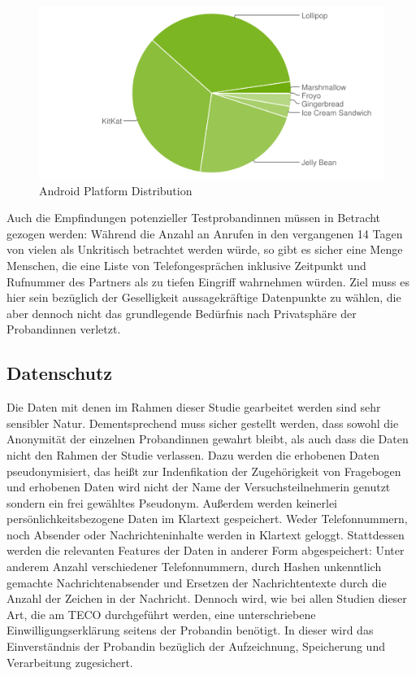 \begin{figure}[h]
    \centering
    \includegraphics{images/chart.png}
    \caption{Android Platform Distribution\cite{androiddistr}}
    \label{fig:androidplatformdistr}
\end{figure}

Auch die Empfindungen potenzieller Testprobandinnen müssen in Betracht gezogen werden:
Während die Anzahl an Anrufen in den vergangenen 14 Tagen von vielen als Unkritisch betrachtet werden würde, so gibt es sicher eine Menge Menschen, 
die eine Liste von Telefongesprächen inklusive Zeitpunkt und Rufnummer des Partners als zu tiefen Eingriff wahrnehmen würden.
Ziel muss es hier sein bezüglich der Geselligkeit aussagekräftige Datenpunkte zu wählen, 
die aber dennoch nicht das grundlegende Bedürfnis nach Privatsphäre der Probandinnen verletzt.


\subsection{Datenschutz}

Die Daten mit denen im Rahmen dieser Studie gearbeitet werden sind sehr sensibler Natur.
Dementsprechend muss sicher gestellt werden, dass sowohl die Anonymität der einzelnen Probandinnen gewahrt bleibt,
als auch dass die Daten nicht den Rahmen der Studie verlassen.
Dazu werden die erhobenen Daten pseudonymisiert, das heißt zur Indenfikation der Zugehörigkeit von Fragebogen und erhobenen Daten wird nicht der Name der Versuchsteilnehmerin genutzt sondern ein frei gewähltes Pseudonym.
Außerdem werden keinerlei persönlichkeitsbezogene Daten im Klartext gespeichert.
Weder Telefonnummern, noch Absender oder Nachrichteninhalte werden in Klartext geloggt.
Stattdessen werden die relevanten Features der Daten in anderer Form abgespeichert:
Unter anderem Anzahl verschiedener Telefonnummern, durch Hashen unkenntlich gemachte Nachrichtenabsender und Ersetzen der Nachrichtentexte durch die Anzahl der Zeichen in der Nachricht.
Dennoch wird, wie bei allen Studien dieser Art, die am TECO durchgeführt werden,
eine unterschriebene Einwilligungserklärung seitens der Probandin benötigt.
In dieser wird das Einverständnis der Probandin bezüglich der Aufzeichnung, Speicherung und Verarbeitung zugesichert.
\par



